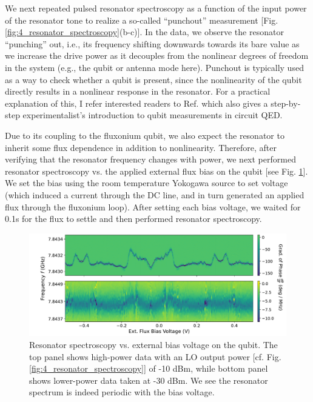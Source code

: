 We next repeated pulsed resonator spectroscopy as a function of the input power of the resonator tone to realize a so-called ``punchout'' measurement [Fig. \ref{fig:4_resonator_spectroscopy}(b-c)]. In the data, we observe the resonator ``punching'' out, i.e., its frequency shifting downwards towards its bare value as we increase the drive power as it decouples from the nonlinear degrees of freedom in the system (e.g., the qubit or antenna mode here). Punchout is typically used as a way to check whether a qubit is present, since the nonlinearity of the qubit directly results in a nonlinear response in the resonator. For a practical explanation of this, I refer interested readers to Ref. \cite{naghiloo2019introduction} which also gives a step-by-step experimentalist's introduction to qubit measurements in circuit QED. 

Due to its coupling to the fluxonium qubit, we also expect the resonator to inherit some flux dependence in addition to nonlinearity. Therefore, after verifying that the resonator frequency changes with power, we next performed resonator spectroscopy vs. the applied external flux bias on the qubit [see Fig. \ref{fig:4_resonator_spectroscopy_vs_flux}]. We set the bias using the room temperature Yokogawa source to set voltage (which induced a current through the DC line, and in turn generated an applied flux through the fluxonium loop). After setting each bias voltage, we waited for 0.1s for the flux to settle and then performed resonator spectroscopy.  

\begin{figure}[h]
    \centering
    \includegraphics[width=\linewidth]{Figures/4/resonator_spectroscopy_vs_flux.pdf}
    \caption[Resonator spectroscopy vs. external applied flux on the fluxonium qubit.]{Resonator spectroscopy vs. external bias voltage on the qubit. The top panel shows high-power data with an LO output power [cf. Fig. \ref{fig:4_resonator_spectroscopy}] of -10 dBm, while bottom panel shows lower-power data taken at -30 dBm. We see the resonator spectrum is indeed periodic with the bias voltage.}
\label{fig:4_resonator_spectroscopy_vs_flux}
\end{figure}

